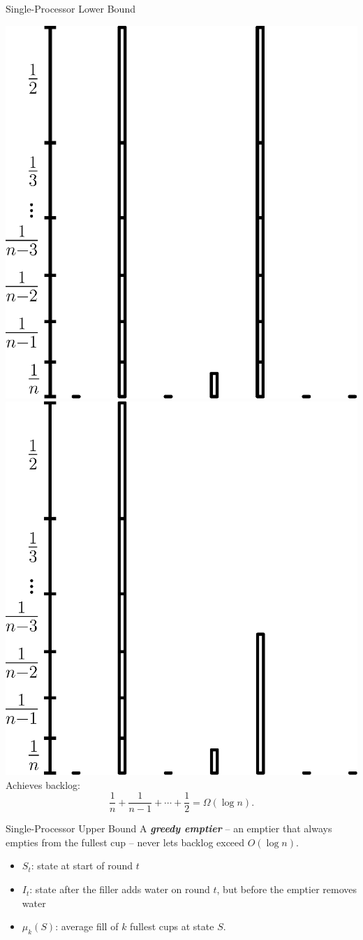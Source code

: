 \documentclass[xcolor=x11names, svgnames, rgb]{beamer}
\newcommand{\defn}[1]       {{\textit{\textbf{\boldmath #1}}}}
\begin{document}
\begin{frame}[t]{Single-Processor Lower Bound}
\begin{overprint}
    \includegraphics[width=0.5\linewidth]{singleProcessorLowerBound/round_6_0.eps}
    \includegraphics[width=0.5\linewidth]{singleProcessorLowerBound/round_6_1.eps}
    \vspace{1.5cm}Achieves backlog: $$\frac{1}{n} + \frac{1}{n-1} + \cdots + \frac{1}{2} = \Omega(\log n).$$ 
  \end{overprint}
\end{frame}

\begin{frame}[t]{Single-Processor Upper Bound}
  A \defn{greedy emptier} -- an emptier that always empties from the
    fullest cup -- never lets backlog exceed $O(\log n)$.

  \vspace{0.75cm}
  \begin{definitions}
  \begin{itemize}
    \item $S_t$: state at start of round $t$
    \item $I_t$: state after the filler adds water on round $t$, but before the emptier removes water
    \item $\mu_k(S)$: average fill of $k$ fullest cups at state $S$.
  \end{itemize}
  \end{definitions}
\end{frame}
\end{document}
